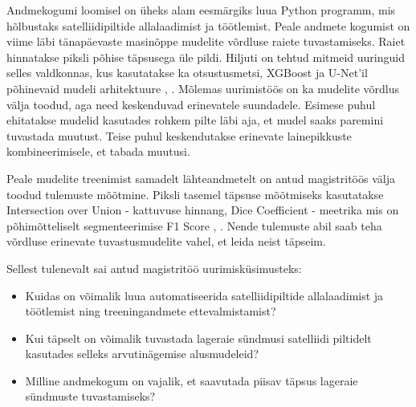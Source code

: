 Andmekogumi loomisel on üheks alam eesmärgiks luua Python programm, mis hõlbustaks satelliidipiltide allalaadimist ja töötlemist. Peale andmete kogumist on viime läbi tänapäevaste masinõppe mudelite võrdluse raiete tuvastamiseks. Raiet hinnatakse piksli põhise täpsusega üle pildi. Hiljuti on tehtud mitmeid uuringuid selles valdkonnas, kus kasutatakse ka otsustusmetsi, XGBoost ja U-Net’il põhinevaid mudeli arhitektuure \cite{isaienkovDeepLearningRegular2021}, \cite{podoprigorovaRecognitionForestDamage2024}. Mõlemas uurimistöös on ka mudelite võrdlus välja toodud, aga need keskenduvad erinevatele suundadele. Esimese puhul ehitatakse mudelid kasutades rohkem pilte läbi aja, et mudel saaks paremini tuvastada muutust. Teise puhul keskendutakse erinevate lainepikkuste kombineerimisele, et tabada muutusi. 

Peale mudelite treenimist samadelt lähteandmetelt on antud magistritöös välja toodud tulemuste mõõtmine. Piksli tasemel täpsuse mõõtmiseks kasutatakse Intersection over Union - kattuvuse hinnang, Dice Coefficient - meetrika mis on põhimõtteliselt segmenteerimise F1 Score \cite{IntersectionUnionIoU}, \cite{UnderstandingDICECOEFFICIENT}. Nende tulemuste abil saab teha võrdluse erinevate tuvastusmudelite vahel, et leida neist täpseim.

Sellest tulenevalt sai antud magistritöö uurimisküsimusteks:
\begin{itemize}
    \item Kuidas on võimalik luua automatiseerida satelliidipiltide allalaadimist ja töötlemist ning treeningandmete ettevalmistamist?
    \item Kui täpselt on võimalik tuvastada lageraie sündmusi satelliidi piltidelt kasutades selleks arvutinägemise alusmudeleid?
    \item Milline andmekogum on vajalik, et saavutada piisav täpsus lageraie sündmuste tuvastamiseks?
\end{itemize}